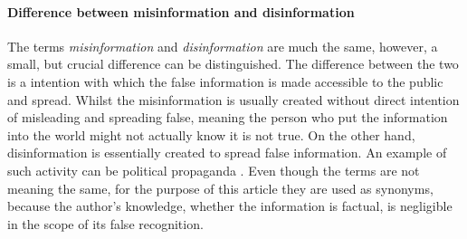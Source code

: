 \documentclass[11pt ,english,a4paper]{article}
\begin{document}
\paragraph{Difference between misinformation and disinformation}
The terms \emph{misinformation} and \emph{disinformation} are much the same, however, a small, but crucial difference can be distinguished. The difference between the two is a intention with which the false information is made accessible to the public and spread. Whilst the misinformation is usually created without direct intention of misleading and spreading false, meaning the person who put the information into the world might not actually know it is not true. On the other hand, disinformation is essentially created to spread false information. An example of such activity can be political propaganda \cite{gu20misinfo} \cite{cook15misinfo}. Even though the terms are not meaning the same, for the purpose of this article they are used as synonyms, because the author's knowledge, whether the information is factual, is negligible in the scope of its false recognition.




\end{document}
